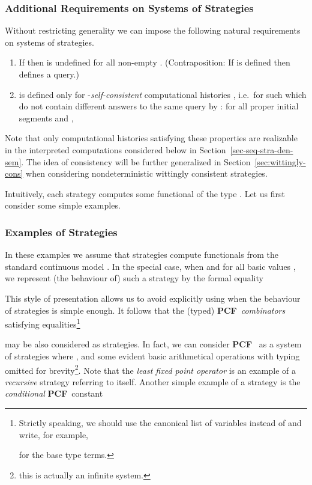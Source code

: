 \documentclass[fleqn]{LMCS}
\theoremstyle{plain}\newtheorem{satz}[thm]{Satz}
\theoremstyle{plain}\newtheorem{hyp}[thm]{Hypothesis}
\theoremstyle{plain}\newtheorem{hyps}[thm]{Hypotheses}
\theoremstyle{definition}\newtheorem{note}[thm]{Note}
\newcommand{\PCF}{\mbox{\bf PCF}}
\newcommand{\?}{\mbox{?}}
\begin{document}
\subsubsection{Additional Requirements on Systems of Strategies}
\label{sec:additional-requirements}

Without restricting generality we can impose the following 
natural requirements on systems of strategies. 
\begin{enumerate}[]
\item
If 
 then  is undefined  
for all non-empty . 
(Contraposition: If  is defined then  defines a query.)
\item 
 is defined only for -\emph{self-consistent}  
computational histories 
, i.e.\ for such  which 
do not contain different answers 
to the same query by : 
for all proper initial segments   
and , 
 
\end{enumerate}
Note that only computational histories 
satisfying these properties are realizable in 
the interpreted computations considered below in 
Section~\ref{sec-seq-stra-den-sem}. The idea of consistency 
will be further generalized in 
Section~\ref{sec:wittingly-cons} 
when considering nondeterministic wittingly consistent strategies. 

Intuitively, each strategy  computes some functional 
 of the type . Let us first consider some simple examples. 


\subsubsection{Examples of Strategies}
\label{sec-seq-stra-def-examples}

In these examples we assume that strategies compute functionals from the 
standard continuous model .
In the special case, when  and
 for all basic values ,  
we represent (the behaviour of) such a strategy  by the formal equality

This style of presentation allows us to avoid explicitly 
using  when the behaviour of strategies is simple enough. 
It follows that the (typed) \PCF\ \emph{combinators} 
satisfying equalities\footnote{Strictly speaking, we should use the canonical list of variables 
 instead of  and write, for example, 
 
for the base type terms.
}

\noindent may be also considered as strategies. 
In fact, we can consider \PCF\ \cite{Scott93,Plotkin77} as 
a system of strategies  where 
, and some evident basic arithmetical operations 
with typing 
omitted for brevity\footnote{this is actually an infinite system. 
}.
Note that the \emph{least fixed point operator}  is an 
example of a \emph{recursive} strategy referring to itself. 
Another simple example
of a strategy is the {\em conditional\/} \PCF\ constant 
 
\end{document}
